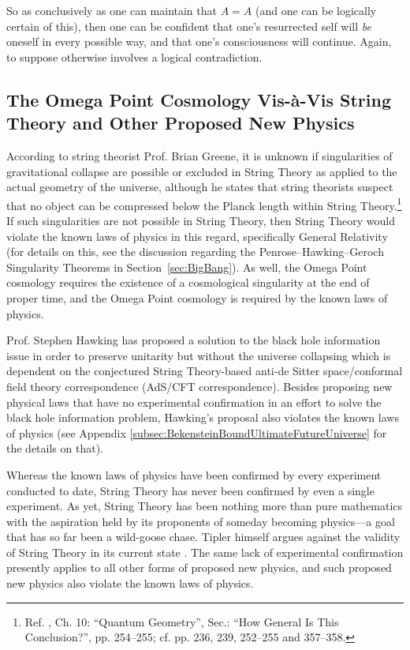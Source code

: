 \documentclass[letterpaper,12pt]{article}
\begin{document}
So as conclusively as one can maintain that \( A = A \) (and one can be logically certain of this), then one can be confident that one's resurrected self will \emph{be} oneself in every possible way, and that one's consciousness will continue. Again, to suppose otherwise involves a logical contradiction.

\subsection{The Omega Point Cosmology Vis-\`{a}-Vis String Theory and Other Proposed New Physics}
\label{subsec:StringTheory}

According to string theorist Prof. Brian Greene, it is unknown if singularities of gravitational collapse are possible or excluded in String Theory as applied to the actual geometry of the universe, although he states that string theorists suspect that no object can be compressed below the Planck length within String Theory.\footnote{Ref. , Ch. 10: ``Quantum Geometry'', Sec.: ``How General Is This Conclusion?'', pp. 254--255; cf. pp. 236, 239, 252--255 and 357--358.} If such singularities are not possible in String Theory, then String Theory would violate the known laws of physics in this regard, specifically General Relativity (for details on this, see the discussion regarding the Penrose--Hawking--Geroch Singularity Theorems in Section~\ref{sec:BigBang}). As well, the Omega Point cosmology requires the existence of a cosmological singularity at the end of proper time, and the Omega Point cosmology is required by the known laws of physics.

Prof. Stephen Hawking has proposed \cite{Hawking2005} a solution to the black hole information issue in order to preserve unitarity but without the universe collapsing which is dependent on the conjectured String Theory-based anti-de Sitter space\slash conformal field theory correspondence (AdS\slash CFT correspondence). Besides proposing new physical laws that have no experimental confirmation in an effort to solve the black hole information problem, Hawking's proposal also violates the known laws of physics (see Appendix \ref{subsec:BekensteinBoundUltimateFutureUniverse} for the details on that).

Whereas the known laws of physics have been confirmed by every experiment conducted to date, String Theory has never been confirmed by even a single experiment. As yet, String Theory has been nothing more than pure mathematics with the aspiration held by its proponents of someday becoming physics---a goal that has so far been a wild-goose chase. Tipler himself argues against the validity of String Theory in its current state \cite{Tipler2005}. The same lack of experimental confirmation presently applies to all other forms of proposed new physics, and such proposed new physics also violate the known laws of physics.
\end{document}
